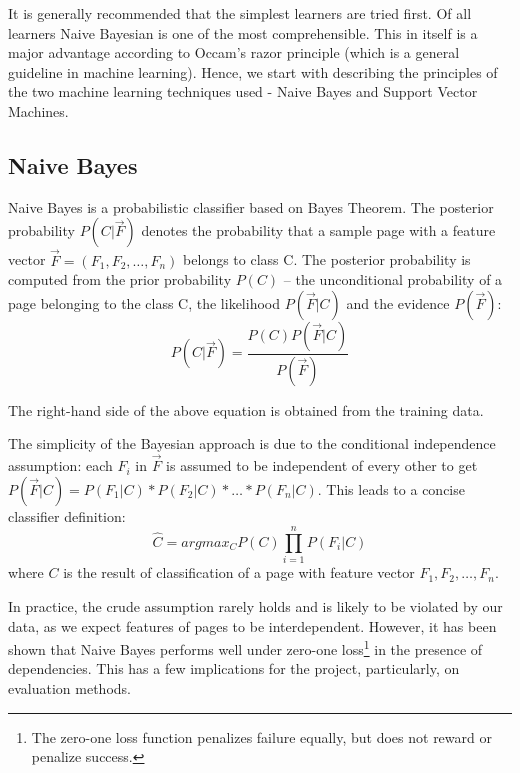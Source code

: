 \documentclass[12pt,notitlepage,twoside]{scrbook}
\begin{document}
It is generally recommended that the simplest learners are tried
first\cite{domingos}. Of all learners Naive Bayesian is one of the most
comprehensible. This in itself is a major advantage according to Occam's razor
principle (which is a general guideline in machine learning).
Hence, we start with describing the principles of the two machine learning
techniques used - Naive Bayes and Support Vector Machines.

\subsection{Naive Bayes}
\label{prep:nb}
Naive Bayes is a probabilistic classifier based on Bayes Theorem. The
posterior probability \(P(C|\vec{F})\) denotes the probability that a sample
page with a feature vector \(\vec{F}=(F_1,F_2,\dots,F_n)\) belongs to class C.
The posterior probability is computed from the prior
probability \(P(C)\) -- the unconditional probability of a page belonging to
the class C, the likelihood \(P(\vec{F}|C)\) and the evidence \(P(\vec{F})\):
\begin{equation}
P(C|\vec{F}) = \frac{P(C)P(\vec{F}|C)}{P(\vec{F})}
\end{equation}

The right-hand side of the above equation is obtained from the training data.

The simplicity of the Bayesian approach is due to the conditional independence
assumption: each \(F_i\) in \(\vec{F}\) is assumed to be independent of every other
to get \(P(\vec{F}|C)=P(F_1|C)*P(F_2|C)*\dots*P(F_n|C)\). This leads to a concise classifier definition:
\begin{equation}
\hat{C}= argmax_C P(C)\prod_{i=1}^{n}P(F_i|C)
\end{equation}
where \(C\) is the result of classification of a page with feature vector
\(F_1,F_2,\dots,F_n\).

In practice, the crude assumption rarely  holds and is likely to be violated by our data,
as we expect features of pages to be interdependent.  However, it has been shown that
Naive Bayes performs well under zero-one loss\footnote{The zero-one loss function
	penalizes failure equally, but does not reward or penalize success.} in the
	presence of dependencies\cite{OPTIM}. This has a few implications for the project,
	particularly, on evaluation methods.
\end{document}
